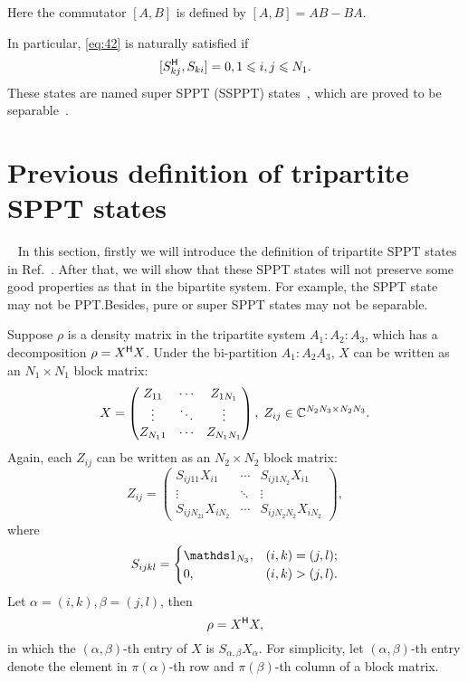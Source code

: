 Here the commutator  $[A,B]$ is defined by $[A,B]= AB-BA$.

In particular, \cref{eq:42} is naturally satisfied if
\begin{equation}
  \label{eq:43}
  [S^{\mathsf{H}}_{kj},S_{ki}]=0,1\leqslant i, j\leqslant N_1.
\end{equation}
These states are named   super SPPT (SSPPT) states~\cite{Chruscinski2008}, which are proved to be  separable~\cite{Bylicka2013}.
        




\section{Previous definition of tripartite SPPT states}%
~\label{sec:old-version-sppt}
In this section, firstly we will  introduce the definition of tripartite SPPT states in Ref.~\cite{SPPT3partite}.
After that, we will show that these SPPT states will not preserve some good properties as that in the bipartite system. For
example, the SPPT state may not be PPT.\@ Besides, pure or super SPPT states may not be separable.

Suppose  $\rho$ is a density matrix in the tripartite system  $A_1:A_2:A_3$, which has a
decomposition $\rho = X^{\mathsf{H}} X$. Under the bi-partition $A_1:A_2A_3$, $X$ can be written as an $N_1\times N_1$ block matrix:
\begin{equation}
  \label{eq:44}
  X =
  \begin{pmatrix}
    Z_{11}&\cdots&Z_{1N_1}\\
    \vdots &\ddots&\vdots\\
    Z_{N_11}&\cdots&Z_{N_1N_1}\\
  \end{pmatrix},\;Z_{ij}\in\mathbb{C}^{N_2N_3\times N_2N_3}.
\end{equation}
Again, each $Z_{ij}$ can be  written as an $N_2\times N_2$ block matrix:
\begin{equation}
  \label{eq:45}
  Z_{ij} 
  =
  \begin{pmatrix}
    S_{ij11}X_{i1}&\cdots&S_{ij1N_2}X_{i1}\\
   \vdots &\ddots &\vdots \\
    S_{ijN_21}X_{iN_2}&\cdots&S_{ijN_2N_2}X_{iN_2}
  \end{pmatrix},
\end{equation}
where
\begin{equation}
  \label{eq:46}
  S_{ijkl} =
  \begin{cases}
    \I_{N_3}, & (i,k) = (j,l);\\
    0,& (i,k) > (j,l).
  \end{cases}
\end{equation}
Let $\alpha = (i,k),\beta = (j,l)$, then
\begin{equation}
   \label{eq:1}
 \rho = X^{\mathsf{H}} X,
\end{equation}
in which  the $(\alpha,\beta)$-th entry of $X$ is $S_{\alpha,\beta}X_\alpha$. For simplicity,  let $(\alpha,\beta)$-th entry denote  the element in $\pi(\alpha)$-th row and $\pi(\beta)$-th column of a block matrix.

